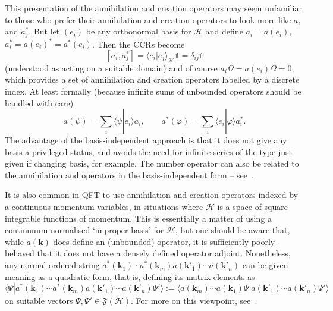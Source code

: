 \documentclass[12pt,a4paper]{article}
\newcommand{\1}{\mathds{1}}                         %
\newcommand{\FF}{{\mathfrak{F}}}
\newcommand{\HH}{{\mathcal{H}}}
\newcommand{\II}{{\mathbb{1}}}
\newcommand{\kb}{{\boldsymbol{k}}}
\newcommand{\ip}[2]{\langle #1|#2\rangle}
\begin{document}
This presentation of the annihilation and creation operators may seem unfamiliar to those who prefer their annihilation and creation operators to look more like $a_i$ and $a_j^*$. But let $(e_i)$ be any orthonormal basis for $\HH$ and define $a_i = a(e_i)$, $a_i^*=a(e_i)^*=a^*(e_i)$. Then the CCRs become
\[
[a_i,a_j^*] = \ip{e_i}{e_j}_\HH \II = \delta_{ij}\II
\]
(understood as acting on a suitable domain) and of course $a_i\Omega=a(e_i)\Omega=0$,
which provides a set of annihilation and creation operators labelled by a discrete index. At least formally (because infinite sums of unbounded operators should be handled with care)
\[
a(\psi) = \sum_i \ip{\psi}{e_i}a_i,\qquad 
a^*(\varphi) = \sum_i \ip{e_i}{\varphi}a_i^*.
\]
The advantage of the basis-independent approach is that it does not give any basis a privileged status, and avoids the need for infinite series of the type just given if changing basis, for example. The number operator can also be related to the annihilation and operators in the basis-independent form -- see~\cite[\S 5.2.3]{BratRob:vol2}.

It is also common in QFT to use annihilation and creation operators indexed by a continuous momentum variables, in situations where $\HH$ is a space of square-integrable functions of momentum. This is essentially a matter of using a continuuum-normalised `improper basis' for $\HH$, but one should be aware that, while
$a(\kb)$ does define an (unbounded) operator, it is sufficiently poorly-behaved that it does not have a densely defined operator adjoint. Nonetheless, any normal-ordered string 
$a^*(\kb_1)\cdots a^*(\kb_m)a(\kb'_{1})\cdots a(\kb'_n)$ can be given
meaning as a quadratic form, that is, defining its matrix elements as
\[
\ip{\Psi}{a^*(\kb_1)\cdots a^*(\kb_m)a(\kb'_{1})\cdots a(\kb'_n)\Psi'}:=
\ip{a(\kb_m)\cdots a(\kb_1)\Psi}{a(\kb'_{1})\cdots a(\kb'_n)\Psi'}
\]  
on suitable vectors $\Psi,\Psi'\in\FF(\HH)$. For more on this viewpoint, see~\cite[\S X.7]{ReedSimon:vol2}.


 
\end{document}
